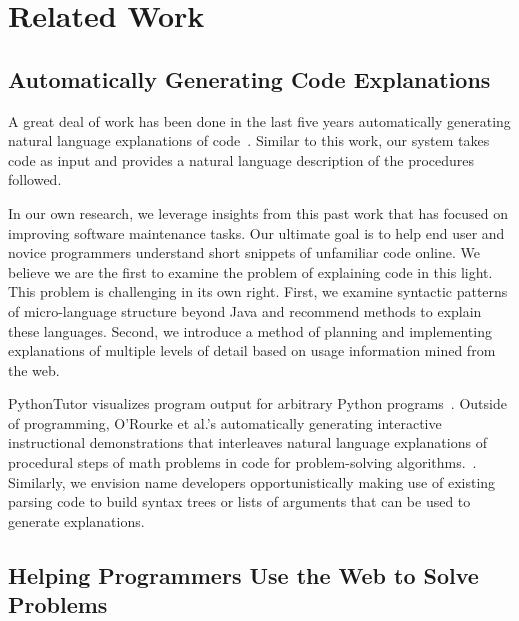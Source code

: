 \section{Related Work}

\subsection{Automatically Generating Code Explanations}

A great deal of work has been done in the last five years automatically generating natural language explanations of code~\cite{sridhara_automatically_2011,burden_natural_2011,sridhara_towards_2010,kamimura_towards_2013,mcburney_automatic_2014,sridhara_generating_2011,haiduc_supporting_2010,moreno_automatic_2013}.
Similar to this work, our system takes code as input and provides a natural language description of the procedures followed.

In our own research, we leverage insights from this past work that has focused on improving software maintenance tasks.
Our ultimate goal is to help end user and novice programmers understand short snippets of unfamiliar code online.
We believe we are the first to examine the problem of explaining code in this light.
This problem is challenging in its own right.
First, we examine syntactic patterns of micro-language structure beyond Java and recommend methods to explain these languages.
Second, we introduce a method of planning and implementing explanations of multiple levels of detail based on usage information mined from the web.

PythonTutor visualizes program output for arbitrary Python programs~\cite{guo_online_2013}.
Outside of programming, O'Rourke et al.'s automatically generating interactive instructional demonstrations that interleaves natural language explanations of procedural steps of math problems in code for problem-solving algorithms.~\cite{orourke_framework_2015}.
Similarly, we envision \gls{name} developers opportunistically making use of existing parsing code to build syntax trees or lists of arguments that can be used to generate explanations.

\subsection{Helping Programmers Use the Web to Solve Problems}

